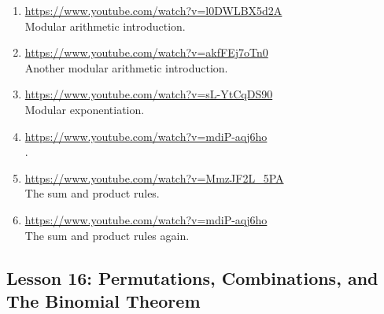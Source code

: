 \documentclass[11pt]{amsart}
\begin{document}
\begin{enumerate}

\item \url{https://www.youtube.com/watch?v=l0DWLBX5d2A}\\
Modular arithmetic introduction.\\[5pt]



\item \url{https://www.youtube.com/watch?v=akfFEj7oTn0}\\
Another modular arithmetic introduction.\\[5pt]



\item \url{https://www.youtube.com/watch?v=sL-YtCqDS90}\\
Modular exponentiation.\\[5pt]



\item \url{https://www.youtube.com/watch?v=mdiP-aqj6ho}\\
.\\[5pt]


\item \url{https://www.youtube.com/watch?v=MmzJF2L_5PA}\\
The sum and product rules.\\[5pt]

\item \url{https://www.youtube.com/watch?v=mdiP-aqj6ho}\\
The sum and product rules again.\\[5pt]

\end{enumerate}

\subsection{Lesson 16: Permutations, Combinations, and The Binomial Theorem}
\end{document}
